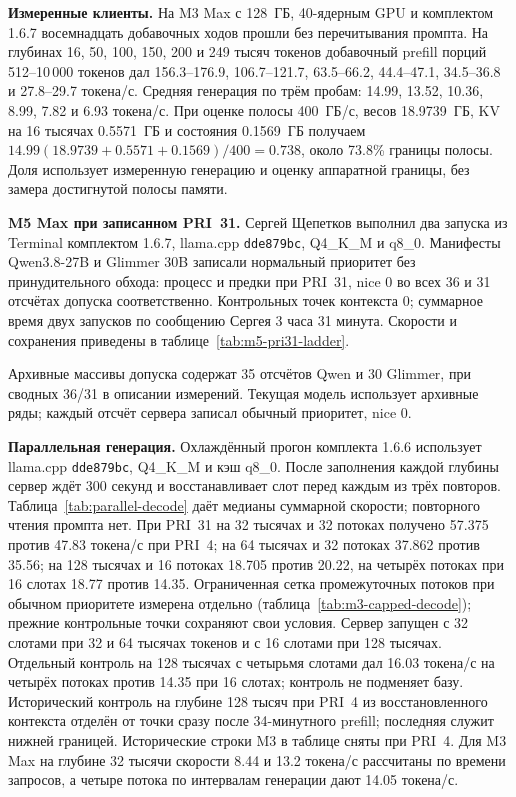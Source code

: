 \textbf{Измеренные клиенты.} На M3 Max с 128~ГБ, 40-ядерным GPU и комплектом 1.6.7
восемнадцать добавочных ходов прошли без перечитывания промпта. На глубинах 16, 50, 100, 150,
200 и 249 тысяч токенов добавочный prefill порций 512--10\,000 токенов дал 156.3--176.9,
106.7--121.7, 63.5--66.2, 44.4--47.1, 34.5--36.8 и 27.8--29.7 токена/с.
Средняя генерация по трём пробам: 14.99, 13.52, 10.36, 8.99, 7.82 и 6.93 токена/с.
При оценке полосы 400~ГБ/с, весов 18.9739~ГБ, KV на 16 тысячах 0.5571~ГБ и состояния 0.1569~ГБ
получаем $14.99(18.9739+0.5571+0.1569)/400=0.738$, около 73.8\% границы полосы.
Доля использует измеренную генерацию и оценку аппаратной границы, без замера достигнутой полосы памяти.

\textbf{M5 Max при записанном PRI~31.} Сергей Щепетков выполнил два запуска из Terminal
комплектом 1.6.7, llama.cpp \texttt{dde879bc}, Q4\_K\_M и q8\_0.
Манифесты Qwen3.8-27B и Glimmer 30B записали нормальный приоритет без принудительного обхода:
процесс и предки при PRI~31, nice 0 во всех 36 и 31 отсчётах допуска соответственно.
Контрольных точек контекста 0; суммарное время двух запусков по сообщению Сергея 3 часа 31 минута.
Скорости и сохранения приведены в таблице~\ref{tab:m5-pri31-ladder}.

Архивные массивы допуска содержат 35 отсчётов Qwen и 30 Glimmer, при сводных 36/31 в описании измерений.
Текущая модель использует архивные ряды; каждый отсчёт сервера записал обычный приоритет, nice 0.

\textbf{Параллельная генерация.} Охлаждённый прогон комплекта 1.6.6 использует llama.cpp
\texttt{dde879bc}, Q4\_K\_M и кэш q8\_0. После заполнения каждой глубины сервер ждёт 300 секунд
и восстанавливает слот перед каждым из трёх повторов. Таблица~\ref{tab:parallel-decode} даёт медианы
суммарной скорости; повторного чтения промпта нет. При PRI~31 на 32 тысячах и 32 потоках получено 57.375 против 47.83 токена/с при PRI~4;
на 64 тысячах и 32 потоках 37.862 против 35.56; на 128 тысячах и 16 потоках 18.705 против 20.22,
на четырёх потоках при 16 слотах 18.77 против 14.35. Ограниченная сетка промежуточных потоков при обычном приоритете измерена отдельно (таблица~\ref{tab:m3-capped-decode}); прежние контрольные точки сохраняют свои условия.
 Сервер запущен с 32 слотами при 32 и 64 тысячах
токенов и с 16 слотами при 128 тысячах. Отдельный контроль на 128 тысячах с четырьмя слотами
дал 16.03 токена/с на четырёх потоках против 14.35 при 16 слотах; контроль не подменяет базу.
Исторический контроль на глубине 128 тысяч при PRI~4 из восстановленного контекста
отделён от точки сразу после 34-минутного prefill; последняя служит нижней границей.
Исторические строки M3 в таблице сняты при PRI~4. Для M3 Max на глубине 32 тысячи скорости 8.44 и 13.2 токена/с рассчитаны по времени запросов, а четыре потока по интервалам генерации дают 14.05 токена/с.

